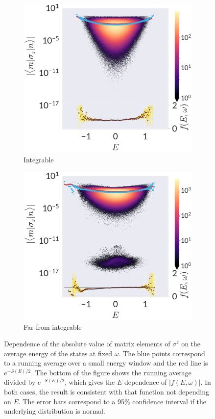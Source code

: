\begin{figure}
\begin{subfigure}[b]{0.45\textwidth}
\includegraphics[width=\textwidth]{figures/chapter1/SigmaZ-E-I.png}
\caption{Integrable}
\end{subfigure}\hfill
\begin{subfigure}[b]{0.45\textwidth}
\includegraphics[width=\textwidth]{figures/chapter1/SigmaZ-E-NI.png}
\caption{Far from integrable}
\end{subfigure}
\caption{Dependence of the absolute value of matrix elements of $\sigma^z$ on the average energy of the states at fixed $\omega$. The blue points correspond to a running average over a small energy window and the red line is $e^{-S(E)/2}$. The bottom of the figure shows the running average divided by $e^{-S(E)/2}$, which gives the $E$ dependence of $|f(E,\omega)|$. In both cases, the result is consistent with that function not depending on $E$. The error bars correspond to a 95\% confidence interval if the underlying distribution is normal.}
\label{fig:edep-sigma}
\end{figure}

